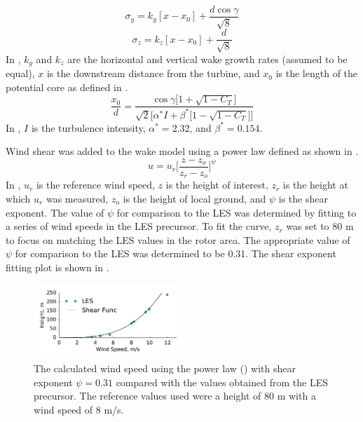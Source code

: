 \documentclass[conf]{new-aiaa}
\begin{document}
%
\begin{equation}\label{eq:sigmay}
	\sigma_y = k_y [x - x_0] + \frac{d \cos{\gamma}}{\sqrt{8}}
\end{equation}
%
%
\begin{equation}\label{eq:sigmaz}
	\sigma_z = k_z [x - x_0] + \frac{d}{\sqrt{8}}
\end{equation}
%
In , $k_y$ and $k_z$ are the horizontal and vertical wake growth rates (assumed to be equal), $x$  is the downstream distance from the turbine, and $x_0$ is the length of the potential core as defined in .
%
\begin{equation}\label{eq:potentialcore}
	\frac{x_0}{d} = \frac{\cos{\gamma }\Big[1+\sqrt{1-C_T}\Big]}{\sqrt{2} \Big[\alpha ^* I + \beta ^* \Big[1- \sqrt{1-C_T}\Big]\Big]}
\end{equation}
In , $I$ is the turbulence intensity, $\alpha^*=2.32$, and $\beta^*=0.154$. 

Wind shear was added to the wake model using a power law defined as shown in .
%
\begin{equation} \label{eq:shear}
	u = u_r\bigg[\frac{z-z_o}{z_r-z_o}\bigg]^\psi
\end{equation}
%
In , $u_r$ is the reference wind speed, $z$ is the height of interest, $z_r$ is the height at which $u_r$ was measured, $z_o$ is the height of local ground, and $\psi$ is the shear exponent. The value of $\psi$ for comparison to the LES was determined by fitting  to a series of wind speeds in the LES precursor. To fit the curve, $z_r$ was set to 80 m to focus on matching the LES values in the rotor area. The appropriate value of $\psi$ for comparison to the LES was determined to be 0.31.
The shear exponent fitting plot is shown in .
%
\begin{figure}[ht]
	\centering
	\includegraphics[width=0.5\textwidth]{final_images/shear_fit.pdf}
	\caption{The calculated wind speed using the power law () with shear exponent $\psi=0.31$ compared with the values obtained from the LES precursor. The reference values used were a height of 80 m with a wind speed of 8 m/s.}
	\label{fig:shear_fit}
\end{figure}
%
\end{document}
